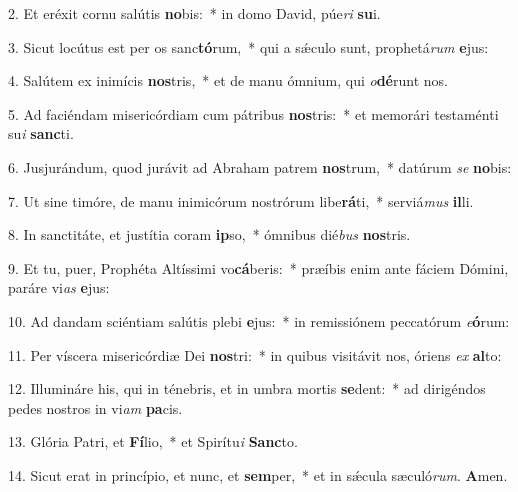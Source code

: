 
2. Et eréxit cornu salútis \textbf{no}bis:~* in domo David, púe\textit{ri} \textbf{su}i.

3. Sicut locútus est per os sanc\textbf{tó}rum,~* qui a s\'{\ae}culo sunt, prophetá\textit{rum} \textbf{e}jus:

4. Salútem ex inimícis \textbf{nos}tris,~* et de manu ómnium, qui \textit{o}\textbf{dé}runt nos.

5. Ad faciéndam misericórdiam cum pátribus \textbf{nos}tris:~* et memorári testaménti su\textit{i} \textbf{sanc}ti.

6. Jusjurándum, quod jurávit ad Abraham patrem \textbf{nos}trum,~* datúrum \textit{se} \textbf{no}bis:

7. Ut sine timóre, de manu inimicórum nostrórum libe\textbf{rá}ti,~* serviá\textit{mus} \textbf{il}li.

8. In sanctitáte, et justítia coram \textbf{ip}so,~* ómnibus dié\textit{bus} \textbf{nos}tris.

9. Et tu, puer, Prophéta Altíssimi vo\textbf{cá}beris:~* præíbis enim ante fáciem Dómini, paráre vi\textit{as} \textbf{e}jus:

10. Ad dandam sciéntiam salútis plebi \textbf{e}jus:~* in remissiónem peccatórum \textit{e}\textbf{ó}rum:

11. Per víscera misericórdiæ Dei \textbf{nos}tri:~* in quibus visitávit nos, óriens \textit{ex} \textbf{al}to:

12. Illumináre his, qui in ténebris, et in umbra mortis \textbf{se}dent:~* ad dirigéndos pedes nostros in vi\textit{am} \textbf{pa}cis.

13. Glória Patri, et \textbf{Fí}lio,~* et Spirítu\textit{i} \textbf{Sanc}to.

14. Sicut erat in princípio, et nunc, et \textbf{sem}per,~* et in s\'{\ae}cula sæculó\textit{rum}. \textbf{A}men.